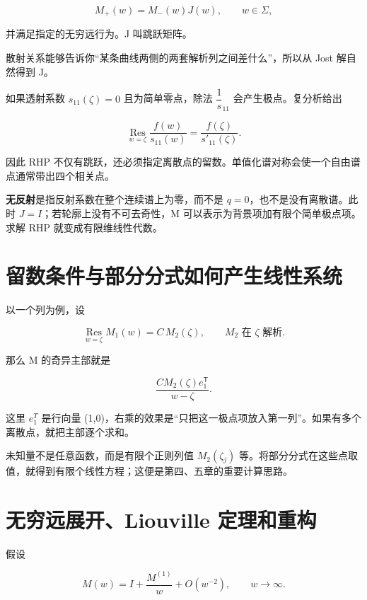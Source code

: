 \[
M_+(w)=M_-(w)J(w),\qquad w\in\Sigma,
\]

并满足指定的无穷远行为。J 叫跳跃矩阵。\par

散射关系能够告诉你“某条曲线两侧的两套解析列之间差什么”，所以从 Jost 解自然得到 J。\par

如果透射系数 $s_{11}(\zeta{})=0$ 且为简单零点，除法 $\dfrac{1}{s}_{11}$ 会产生极点。复分析给出\par

\[
\operatorname*{Res}_{w=\zeta}\dfrac{f(w)}{s_{11}(w)}
=\dfrac{f(\zeta)}{s'_{11}(\zeta)}.
\]

因此 RHP 不仅有跳跃，还必须指定离散点的留数。单值化谱对称会使一个自由谱点通常带出四个相关点。\par

\textbf{无反射}是指反射系数在整个连续谱上为零，而不是 $q=0$，也不是没有离散谱。此时 $J=I$；若轮廓上没有不可去奇性，M 可以表示为背景项加有限个简单极点项。求解 RHP 就变成有限维线性代数。\par

\section{留数条件与部分分式如何产生线性系统}

以一个列为例，设\par

\[
\operatorname*{Res}_{w=\zeta}M_1(w)=C\,M_2(\zeta),
\qquad M_2 \text{ 在 }\zeta\text{ 解析}.
\]

那么 M 的奇异主部就是\par

\[
\dfrac{C M_2(\zeta)e_1^{\mathsf T}}{w-\zeta}.
\]

这里 $e_{1}^{T}$ 是行向量 (1,0)，右乘的效果是“只把这一极点项放入第一列”。如果有多个离散点，就把主部逐个求和。\par

未知量不是任意函数，而是有限个正则列值 $M_{2}(\zeta{}_{j})$ 等。将部分分式在这些点取值，就得到有限个线性方程；这便是第四、五章的重要计算思路。\par

\section{无穷远展开、Liouville 定理和重构}

假设\par

\[
M(w)=I+\dfrac{M^{(1)}}{w}+O(w^{-2}),\qquad w\to\infty.
\]

